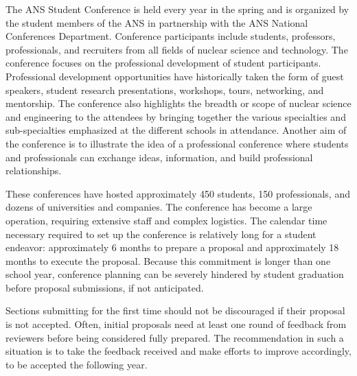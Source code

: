 \documentclass[12pt]{article}
\begin{document}
The ANS Student Conference is held every year in the spring and is organized by the student members of the ANS in partnership with the ANS National Conferences Department. Conference participants include students, professors, professionals, and recruiters from all fields of nuclear science and technology. The conference focuses on the professional development of student participants. Professional development opportunities have historically taken the form of guest speakers, student research presentations, workshops, tours, networking, and mentorship. The conference also highlights the breadth or scope of nuclear science and engineering to the attendees by bringing together the various specialties and sub-specialties emphasized at the different schools in attendance. Another aim of the conference is to illustrate the idea of a professional conference where students and professionals can exchange ideas, information, and build professional relationships.

These conferences have hosted approximately 450 students, 150 professionals, and dozens of universities and companies. The conference has become a large operation, requiring extensive staff and complex logistics. The calendar time necessary required to set up the conference is relatively long for a student endeavor: approximately 6 months to prepare a proposal and approximately 18 months to execute the proposal. Because this commitment is longer than one school year, conference planning can be severely hindered by student graduation before proposal submissions, if not anticipated.

Sections submitting for the first time should not be discouraged if their proposal is not accepted. Often, initial proposals need at least one round of feedback from reviewers before being considered fully prepared. The recommendation in such a situation is to take the feedback received and make efforts to improve accordingly, to be accepted the following year.
\end{document}
